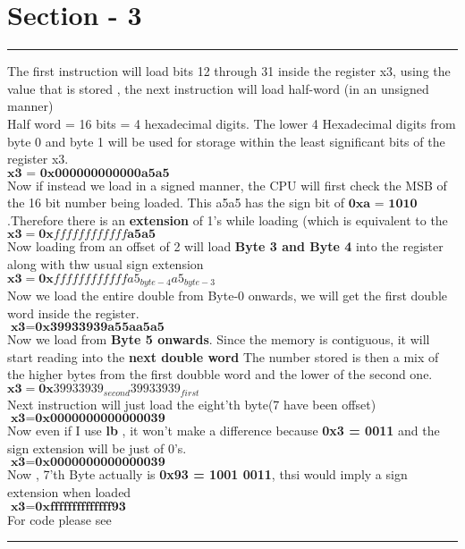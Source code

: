 \section{Section - 3}
\vspace{5pt}
\hrule
\vspace{5pt}
The first instruction will load bits 12 through 31 inside the register x3, using the
value that is stored ,
the next instruction will load half-word (in an unsigned manner)
\\
Half word  = 16 bits  = 4 hexadecimal digits.
The lower 4 Hexadecimal digits from byte 0 and byte 1 will be used for storage within the least significant bits
of the register x3.
\\
$\textbf{x3 = 0x000000000000a5a5} $
\\
Now if instead we load in a signed manner, the CPU will first check the MSB 
of the 16 bit number being loaded. This a5a5 has the sign bit of $\textbf{0xa = 1010}$
.Therefore there is an \textbf{extension} of 1's while loading (which is equivalent to the 
$\textbf{x3} = \textbf{0x}ffffffffffff\textbf{a5a5}$
\\
Now loading from  an offset of 2 will load \textbf{Byte 3 and Byte 4} into the register along with thw usual sign extension
\\
$\textbf{x3} = \textbf{0x}ffffffffffff\textbf{$a5_{byte-4}a5_{byte-3}$}$
\\
Now we load the entire double from Byte-0 onwards, we will get the first double word inside
the register.
\\
$\textbf{x3} = \textbf{0x39933939a55aa5a5}$
\\
Now we load from \textbf{Byte 5 onwards}. Since the memory is contiguous, it will start reading into the \textbf{next double word}
The number stored is then a mix of the higher bytes from the first doubble word and the lower of the second one.
$\textbf{x3} = \textbf{0x$39933939_{second} 39933939_{first}$}$
\\
Next instruction will just load the eight'th byte(7 have been offset)
\\
$\textbf{x3} = \textbf{0x0000000000000039}$
\\
Now even if I use \textbf{lb} , it won't make a difference because \textbf{0x3 = 0011} and the sign extension 
will be just of 0's.\\
$\textbf{x3} = \textbf{0x0000000000000039}$
\\
Now , 7'th Byte actually is \textbf{0x93 = 1001 0011}, thsi would imply a sign extension when loaded
\\
$\textbf{x3} = \textbf{0xffffffffffffff93}$
\\
For code please see \cite{CS2323}
\vspace{5pt}
\hrule

